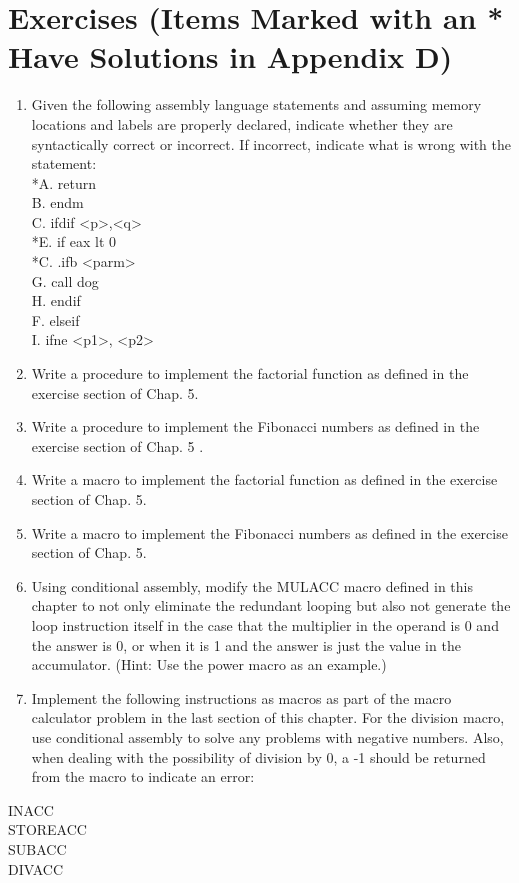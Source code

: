 \documentclass[10pt]{book}
\begin{document}
\section{Exercises (Items Marked with an * Have Solutions in Appendix D)}
\begin{enumerate}
  \item Given the following assembly language statements and assuming memory locations and labels are properly declared, indicate whether they are syntactically correct or incorrect. If incorrect, indicate what is wrong with the statement:\\
*A. return\\
B. endm\\
C. ifdif <p>,<q>\\
*E. if eax lt 0\\
*C. .ifb <parm>\\
G. call dog\\
H. endif\\
F. elseif\\
I. ifne <p1>, <p2>
  \item Write a procedure to implement the factorial function as defined in the exercise section of Chap. 5.
  \item Write a procedure to implement the Fibonacci numbers as defined in the exercise section of Chap. 5 .
  \item Write a macro to implement the factorial function as defined in the exercise section of Chap. 5.
  \item Write a macro to implement the Fibonacci numbers as defined in the exercise section of Chap. 5.
  \item Using conditional assembly, modify the MULACC macro defined in this chapter to not only eliminate the redundant looping but also not generate the loop instruction itself in the case that the multiplier in the operand is 0 and the answer is 0, or when it is 1 and the answer is just the value in the accumulator. (Hint: Use the power macro as an example.)
  \item Implement the following instructions as macros as part of the macro calculator problem in the last section of this chapter. For the division macro, use conditional assembly to solve any problems with negative numbers. Also, when dealing with the possibility of division by 0, a -1 should be returned from the macro to indicate an error:
\end{enumerate}
INACC\\
STOREACC\\
SUBACC\\
DIVACC
\end{document}
